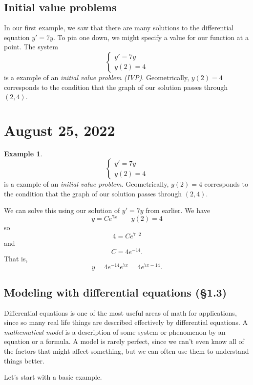 \documentclass[12pt]{amsart}
\numberwithin{equation}{section}
\theoremstyle{plain} %
\newcommand{\Aug}[1]{\section{August #1, 2022}}
\theoremstyle{definition}
\newtheorem{ex}[equation]{Example}
\theoremstyle{remark}
\begin{document}
\subsection*{Initial value problems}

In our first example, we saw that there are many solutions to the differential equation $y'=7y$. To pin one down, we might specify a value for our function at a point. The system
\[\begin{cases} y' = 7y \\ 
y(2)=4 \end{cases}\]
is a example of an \emph{initial value problem (IVP)}. Geometrically, $y(2)=4$ corresponds to the condition that the graph of our solution passes through $(2,4)$.




\Aug{25}

\begin{ex}\label{ex:first IVP}
\[\begin{cases} y' = 7y \\ 
y(2)=4 \end{cases}\]
is a example of an \emph{initial value problem}. Geometrically, $y(2)=4$ corresponds to the condition that the graph of our solution passes through $(2,4)$.


We can solve this using our solution of $y'=7y$ from earlier. We have
\[ y= Ce^{7x} \qquad y(2)=4\]
so \[ 4 = C e^{7 \cdot 2}\]
and \[ C= 4e^{-14}.\]
That is,
\[ y= 4e^{-14}e^{7x} = 4 e^{7x-14}.\]
\end{ex}

\subsection*{Modeling with differential equations (\S1.3)}

Differential equations is one of the most useful areas of math for applications, since so many real life things are described effectively by differential equations. A \emph{mathematical model} is a description of some system or phenomenon by an equation or a formula. A model is rarely perfect, since we can't even know all of the factors that might affect something, but we can often use them to understand things better.

Let's start with a basic example.
\end{document}
